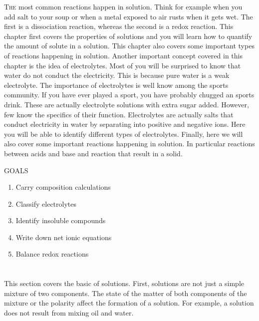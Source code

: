 \documentclass[main.tex]{subfiles}
\begin{document}
\lettrine[lines=4]{\color{black!45}T}{he} most common reactions happen in solution. Think for example when you add salt to your soup or when a metal exposed to air rusts when it gets wet. The first is a dissociation reaction, whereas the second is a redox reaction. This chapter first covers the properties of solutions and you will learn how to quantify the amount of solute in a solution. This chapter also covers some important types of reactions happening in solution. Another important concept covered in this chapter is the idea of electrolytes. Most of you will be surprised to know that water do not conduct the electricity. This is because pure water is a weak electrolyte. The importance of electrolytes is well know among the sports community. If you have ever played a sport, you have probably chugged an sports drink. These are actually electrolyte solutions with extra sugar added. However, few know the specifics of their function. Electrolytes are actually salts that conduct electricity in water by separating into positive and negative ions. Here you will be able to identify different types of electrolytes. Finally, here we will also cover some important reactions happening in solution. In particular reactions between acids and base and reaction that result in a solid.
\begin{marginfigure}%
\begin{mytcbox}{GOALS}
\begin{enumerate}[label=\protect\circled{\color{white}\arabic*}]
\item Carry composition calculations
\item Classify electrolytes
\item Identify insoluble compounds
\item Write down net ionic equations
\item Balance redox reactions
\end{enumerate}
\end{mytcbox}
\end{marginfigure}%




\section{\color{blue!30!black}{Solutions and composition}}
This section covers the basic of solutions. First, solutions are not just a simple mixture of two components. The state of the matter of both components of the mixture or the polarity affect the formation of a solution. For example, a solution does not result from mixing oil and water. 
\sloppy
 
\end{document}
